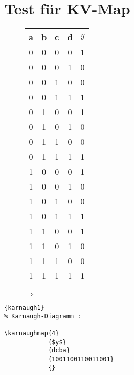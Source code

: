 

\section{Test für KV-Map}

\begin{figure}[h!]
\begin{minipage}{0.35\textwidth}
	\begin{tabular}{cccc|c}
		a
		& b
		& c
		& d
		&$y$\\
		\hline
		0 & 0 & 0 & 0 & 1 \\
		0 & 0 & 0 & 1 & 0 \\
		0 & 0 & 1 & 0 & 0 \\
		0 & 0 & 1 & 1 & 1 \\
		0 & 1 & 0 & 0 & 1 \\
		0 & 1 & 0 & 1 & 0 \\
		0 & 1 & 1 & 0 & 0 \\
		0 & 1 & 1 & 1 & 1 \\
		1 & 0 & 0 & 0 & 1 \\
		1 & 0 & 0 & 1 & 0 \\
		1 & 0 & 1 & 0 & 0 \\
		1 & 0 & 1 & 1 & 1 \\
		1 & 1 & 0 & 0 & 1 \\
		1 & 1 & 0 & 1 & 0 \\
		1 & 1 & 1 & 0 & 0 \\
		1 & 1 & 1 & 1 & 1 \\
	\end{tabular}
\end{minipage}
\begin{minipage}{0.1\textwidth}
	\Huge$\Rightarrow$\normalsize
\end{minipage}
\begin{minipage}{0.5\textwidth}
	\kvnoindex
\end{minipage}
\end{figure}
\begin{lstlisting}[caption=Karnaugh-Diagramm]{karnaugh1}
% Karnaugh-Diagramm : 

\karnaughmap{4}
            {$y$}
            {dcba}
            {1001100110011001}
            {}
\end{lstlisting}

